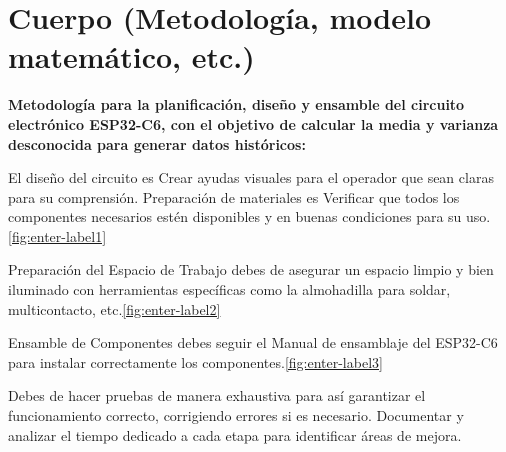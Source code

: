     \section{Cuerpo (Metodología, modelo matemático, etc.)}
    
    \textbf{Metodología para la planificación, diseño y ensamble del circuito electrónico ESP32-C6, con el objetivo de calcular la media y varianza desconocida para generar datos históricos:}
    
    El diseño del circuito es Crear ayudas visuales para el operador que sean claras para su comprensión.
    Preparación de materiales es Verificar que todos los componentes necesarios estén disponibles y en buenas condiciones para su uso.
    \ref{fig:enter-label1}
    
    Preparación del Espacio de Trabajo debes de asegurar un espacio limpio y bien iluminado con herramientas específicas como la almohadilla para soldar, multicontacto, etc.\ref{fig:enter-label2} 
    
    Ensamble de Componentes debes seguir el Manual de ensamblaje del ESP32-C6 para instalar correctamente los componentes.\ref{fig:enter-label3}
    
    Debes de hacer pruebas de manera exhaustiva para así garantizar el funcionamiento correcto, corrigiendo errores si es necesario.
    Documentar y analizar el tiempo dedicado a cada etapa para identificar áreas de mejora.
    

